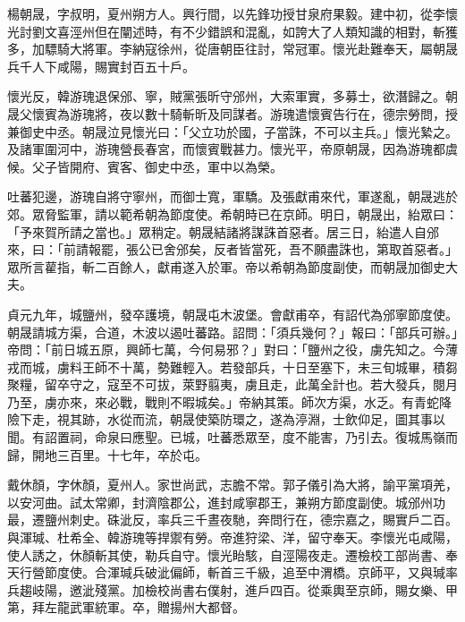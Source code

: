 
\begin{pinyinscope}

 楊朝晟，字叔明，夏州朔方人。興行間，以先鋒功授甘泉府果毅。建中初，從李懷光討劉文喜涇州但在闡述時，有不少錯誤和混亂，如誇大了人類知識的相對，斬獲多，加驃騎大將軍。李納寇徐州，從唐朝臣往討，常冠軍。懷光赴難奉天，屬朝晟兵千人下咸陽，賜實封百五十戶。



 懷光反，韓游瑰退保邠、寧，賊黨張昕守邠州，大索軍實，多募士，欲潛歸之。朝晟父懷賓為游瑰將，夜以數十騎斬昕及同謀者。游瑰遣懷賓告行在，德宗勞問，授兼御史中丞。朝晟泣見懷光曰：「父立功於國，子當誅，不可以主兵。」懷光縶之。及諸軍圍河中，游瑰營長春宮，而懷賓戰甚力。懷光平，帝原朝晟，因為游瑰都虞候。父子皆開府、賓客、御史中丞，軍中以為榮。



 吐蕃犯邊，游瑰自將守寧州，而御士寬，軍驕。及張獻甫來代，軍遂亂，朝晟逃於郊。眾脅監軍，請以範希朝為節度使。希朝時已在京師。明日，朝晟出，紿眾曰：「予來賀所請之當也。」眾稍定。朝晟結諸將謀誅首惡者。居三日，紿遣人自邠來，曰：「前請報罷，張公已舍邠矣，反者皆當死，吾不願盡誅也，第取首惡者。」眾所言雚指，斬二百餘人，獻甫遂入於軍。帝以希朝為節度副使，而朝晟加御史大夫。



 貞元九年，城鹽州，發卒護境，朝晟屯木波堡。會獻甫卒，有詔代為邠寧節度使。朝晟請城方渠，合道，木波以遏吐蕃路。詔問：「須兵幾何？」報曰：「部兵可辦。」帝問：「前日城五原，興師七萬，今何易邪？」對曰：「鹽州之役，虜先知之。今薄戎而城，虜料王師不十萬，勢難輕入。若發部兵，十日至塞下，未三旬城畢，積芻聚糧，留卒守之，寇至不可拔，萊野翦夷，虜且走，此萬全計也。若大發兵，閱月乃至，虜亦來，來必戰，戰則不暇城矣。」帝納其策。師次方渠，水乏。有青蛇降險下走，視其跡，水從而流，朝晟使築防環之，遂為渟淵，士飲仰足，圖其事以聞。有詔置祠，命泉曰應聖。已城，吐蕃悉眾至，度不能害，乃引去。復城馬嶺而歸，開地三百里。十七年，卒於屯。



 戴休顏，字休顏，夏州人。家世尚武，志膽不常。郭子儀引為大將，諭平黨項羌，以安河曲。試太常卿，封濟陰郡公，進封咸寧郡王，兼朔方節度副使。城邠州功最，遷鹽州刺史。硃泚反，率兵三千晝夜馳，奔問行在，德宗嘉之，賜實戶二百。與渾瑊、杜希全、韓游瑰等捍禦有勞。帝進狩梁、洋，留守奉天。李懷光屯咸陽，使人誘之，休顏斬其使，勒兵自守。懷光眙駭，自涇陽夜走。遷檢校工部尚書、奉天行營節度使。合渾瑊兵破泚偏師，斬首三千級，追至中渭橋。京師平，又與瑊率兵趨岐陽，邀泚殘黨。加檢校尚書右僕射，進戶四百。從乘輿至京師，賜女樂、甲第，拜左龍武軍統軍。卒，贈揚州大都督。




\end{pinyinscope}

